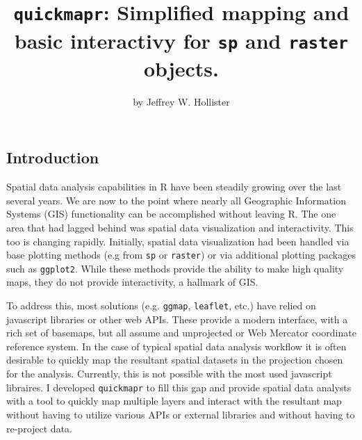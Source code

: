 \title{\texttt{quickmapr}: Simplified mapping and basic interactivy for
\texttt{sp} and \texttt{raster} objects.}
\author{by Jeffrey W. Hollister}

\maketitle


\subsection{Introduction}\label{introduction}

Spatial data analysis capabilities in R have been steadily growing over
the last several years. We are now to the point where nearly all
Geographic Information Systems (GIS) functionality can be accomplished
without leaving R. The one area that had lagged behind was spatial data
visualization and interactivity. This too is changing rapidly.
Initially, spatial data visualization had been handled via base plotting
methods (e.g from \texttt{sp} or \texttt{raster}) or via additional
plotting packages such as \texttt{ggplot2}. While these methods provide
the ability to make high quality maps, they do not provide
interactivity, a hallmark of GIS.

To address this, most solutions (e.g. \texttt{ggmap}, \texttt{leaflet},
etc.) have relied on javascript libraries or other web APIs. These
provide a modern interface, with a rich set of basemaps, but all assume
and unprojected or Web Mercator coordinate reference system. In the case
of typical spatial data analysis workflow it is often desirable to
quickly map the resultant spatial datasets in the projection chosen for
the analysis. Currently, this is not possible with the most used
javascript libraires. I developed \texttt{quickmapr} to fill this gap
and provide spatial data analysts with a tool to quickly map multiple
layers and interact with the resultant map without having to utilize
various APIs or external libraries and without having to re-project
data.

